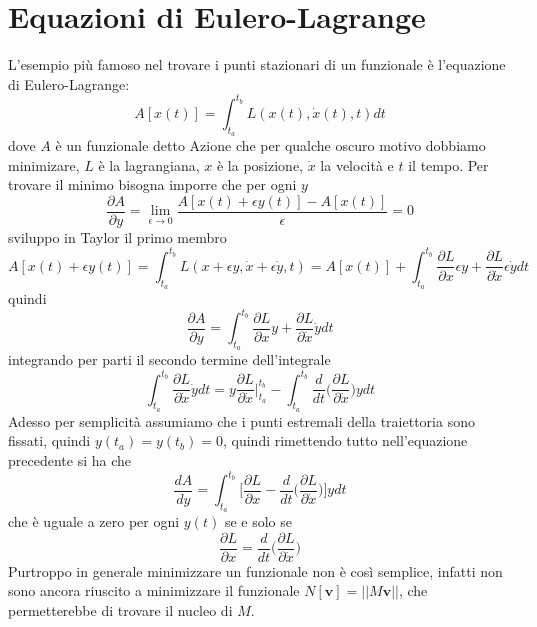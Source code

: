 \documentclass[11pt,a4paper]{report}
\newcommand{\vettore}[1]{\mathbf{#1}}
\theoremstyle{definition}
\theoremstyle{plain}
\theoremstyle{plain}
\begin{document}
		\section{Equazioni di Eulero-Lagrange}
			L'esempio più famoso nel trovare i punti stazionari di un funzionale è l'equazione di Eulero-Lagrange:
			\begin{equation}
				A[x(t)]=\int_{t_a}^{t_b}L(x(t),\dot{x}(t),t)dt
			\end{equation}
			dove $A$ è un funzionale detto Azione che per qualche oscuro motivo dobbiamo minimizare, $L$ è la lagrangiana, $x$ è la posizione, $\dot{x}$ la velocità e $t$ il tempo.
			Per trovare il minimo bisogna imporre che per ogni $y$
			\[
				\frac{\partial A}{\partial y}=\lim_{\epsilon \to 0}\frac{A[x(t)+\epsilon y(t)]-A[x(t)]}{\epsilon}=0
			\]
			sviluppo in Taylor il primo membro
			\[
				A[x(t)+\epsilon y(t)]=\int_{t_a}^{t_b}L(x+\epsilon y,\dot{x}+\epsilon \dot{y},t)=A[x(t)]+\int_{t_a}^{t_b}\frac{\partial{L}}{\partial{x}}\epsilon y+\frac{\partial{L}}{\partial{\dot{x}}}\epsilon \dot{y}dt
			\]
			quindi
			\[
				\frac{\partial A}{\partial y}=\int_{t_a}^{t_b}\frac{\partial{L}}{\partial{x}}y+\frac{\partial{L}}{\partial{\dot{x}}}\dot{y}dt
			\]
			integrando per parti il secondo termine dell'integrale
			\[
				\int_{t_a}^{t_b}\frac{\partial{L}}{\partial{\dot{x}}}\dot{y}dt=y\frac{\partial{L}}{\partial{\dot{x}}}\bigg\rvert_{t_a}^{t_b}-
				\int_{t_a}^{t_b}\frac{d}{dt}\bigg(\frac{\partial{L}}{\partial{\dot{x}}} \bigg)ydt
			\]
			Adesso per semplicità assumiamo che i punti estremali della traiettoria sono fissati, quindi $y(t_a)=y(t_b)=0$, quindi rimettendo tutto nell'equazione precedente si ha che
			\begin{equation}
				\frac{dA}{dy}=\int_{t_a}^{t_b}\bigg[\frac{\partial{L}}{\partial{x}}-\frac{d}{dt}\bigg(\frac{\partial{L}}{\partial{\dot{x}}} \bigg)\bigg]ydt
			\end{equation}
			che è uguale a zero per ogni $y(t)$ se e solo se 
			\begin{equation}
				\frac{\partial{L}}{\partial{x}}=\frac{d}{dt}\bigg(\frac{\partial{L}}{\partial{\dot{x}}} \bigg)
			\end{equation}
		Purtroppo in generale minimizzare un funzionale non è così semplice, infatti non sono ancora riuscito a minimizzare il funzionale $N[\vettore v]=||M\vettore v||$, che permetterebbe di trovare il nucleo di $M$.
\end{document}
